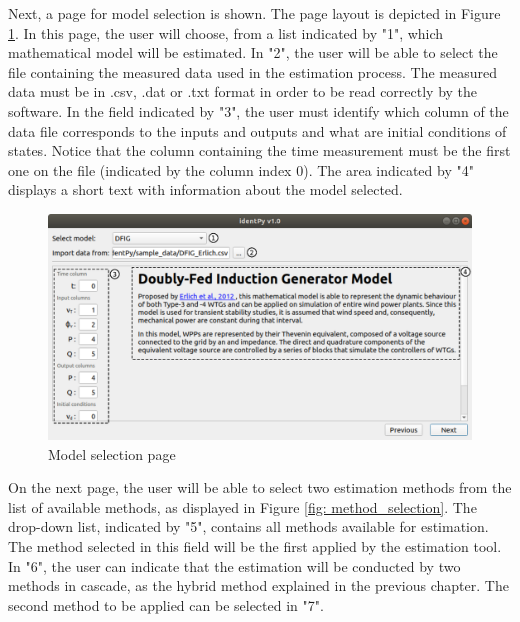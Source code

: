 Next, a page for model selection is shown. The page layout is depicted in Figure \ref{fig: model_selection}. In this page, the user will choose, from a list indicated by "1", which mathematical model will be estimated. In "2", the user will be able to select the file containing the measured data used in the estimation process. The measured data must be in .csv, .dat or .txt format in order to be read correctly by the software. In the field indicated by "3", the user must identify which column of the data file corresponds to the inputs and outputs and what are initial conditions of states. Notice that the column containing the time measurement must be the first one on the file (indicated by the column index $0$). The area indicated by "4" displays a short text with information about the model selected.

\begin{figure}[!h]
	\caption{Model selection page}
	\begin{center}
		\includegraphics[scale=.5]{Images/Software_model_page.eps}
	\end{center}
	\label{fig: model_selection}
\end{figure}

On the next page, the user will be able to select two estimation methods from the list of available methods, as displayed in Figure \ref{fig: method_selection}. The drop-down list, indicated by "5", contains all methods available for estimation. The method selected in this field will be the first applied by the estimation tool. In "6", the user can indicate that the estimation will be conducted by two methods in cascade, as the hybrid method explained in the previous chapter. The second method to be applied can be selected in "7".

